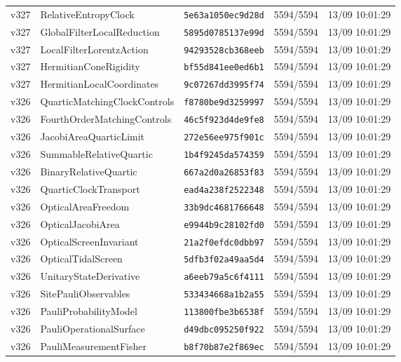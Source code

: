 \documentclass[11pt]{article}
\theoremstyle{definition}\newtheorem{deriv}{Derivação}
\begin{document}
{\begin{longtable}{@{}lllll@{}}
v327 & RelativeEntropyClock & \texttt{5e63a1050ec9d28d} & 5594/5594 & 13/09 10:01:29 \\
v327 & GlobalFilterLocalReduction & \texttt{5895d0785137e99d} & 5594/5594 & 13/09 10:01:29 \\
v327 & LocalFilterLorentzAction & \texttt{94293528cb368eeb} & 5594/5594 & 13/09 10:01:29 \\
v327 & HermitianConeRigidity & \texttt{bf55d841ee0ed6b1} & 5594/5594 & 13/09 10:01:29 \\
v327 & HermitianLocalCoordinates & \texttt{9c07267dd3995f74} & 5594/5594 & 13/09 10:01:29 \\
v326 & QuarticMatchingClockControls & \texttt{f8780be9d3259997} & 5594/5594 & 13/09 10:01:29 \\
v326 & FourthOrderMatchingControls & \texttt{46c5f923d4de9fe8} & 5594/5594 & 13/09 10:01:29 \\
v326 & JacobiAreaQuarticLimit & \texttt{272e56ee975f901c} & 5594/5594 & 13/09 10:01:29 \\
v326 & SummableRelativeQuartic & \texttt{1b4f9245da574359} & 5594/5594 & 13/09 10:01:29 \\
v326 & BinaryRelativeQuartic & \texttt{667a2d0a26853f83} & 5594/5594 & 13/09 10:01:29 \\
v326 & QuarticClockTransport & \texttt{ead4a238f2522348} & 5594/5594 & 13/09 10:01:29 \\
v326 & OpticalAreaFreedom & \texttt{33b9dc4681766648} & 5594/5594 & 13/09 10:01:29 \\
v326 & OpticalJacobiArea & \texttt{e9944b9c28102fd0} & 5594/5594 & 13/09 10:01:29 \\
v326 & OpticalScreenInvariant & \texttt{21a2f0efdc0dbb97} & 5594/5594 & 13/09 10:01:29 \\
v326 & OpticalTidalScreen & \texttt{5dfb3f02a49aa5d4} & 5594/5594 & 13/09 10:01:29 \\
v326 & UnitaryStateDerivative & \texttt{a6eeb79a5c6f4111} & 5594/5594 & 13/09 10:01:29 \\
v326 & SitePauliObservables & \texttt{533434668a1b2a55} & 5594/5594 & 13/09 10:01:29 \\
v326 & PauliProbabilityModel & \texttt{113800fbe3b6538f} & 5594/5594 & 13/09 10:01:29 \\
v326 & PauliOperationalSurface & \texttt{d49dbc095250f922} & 5594/5594 & 13/09 10:01:29 \\
v326 & PauliMeasurementFisher & \texttt{b8f70b87e2f869ec} & 5594/5594 & 13/09 10:01:29 \\

\end{longtable}}
\end{document}
